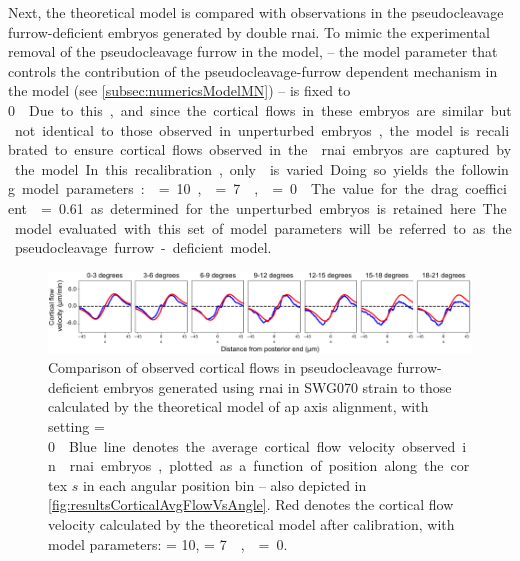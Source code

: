Next, the theoretical model is compared with observations in the pseudocleavage furrow-deficient embryos generated by  double \ac{rnai}. To mimic the experimental removal of the pseudocleavage furrow in the model, \nematicLength -- the model parameter that controls the contribution of the pseudocleavage-furrow dependent mechanism in the model (see \autoref{subsec:numericsModelMN}) -- is fixed to \SI{0}{\square\unitLength\per\second}. Due to this, and since the cortical flows in these embryos are similar but not identical to those observed in unperturbed embryos, the model is recalibrated to ensure cortical flows observed in the  \ac{rnai} embryos are captured by the model. In this recalibration, only \activeRelaxLength is varied. Doing so yields the following model parameters: \hydrodynamicLength = \SI{10}{\unitLength}, \activeRelaxLength = \SI{7}{\square\unitLength\per\second}, \nematicLength = \SI{0}{\square\unitLength\per\second}. The value for the drag coefficient \dragCoefficient = \num{0.61} as determined for the unperturbed embryos is retained here. The model evaluated with this set of model parameters will be referred to as the pseudocleavage furrow-deficient model.

\begin{figure}
    \centering
    \includegraphics[width=\textwidth]{Results/FigComparePCF/nopMelCorticalFlowModel.pdf}
    \caption[Calibrating theoretical model using cortical flows observed in pseudocleavage furrow-deficient embryos]{Comparison of observed cortical flows in pseudocleavage furrow-deficient embryos generated using  \ac{rnai} in SWG070 strain to those calculated by the theoretical model of \ac{ap} axis alignment, with setting \nematicLength = \SI{0}{\square\unitLength\per\second}. Blue line denotes the average cortical flow velocity observed in  \ac{rnai} embryos, plotted as a function of position along the cortex $s$ in each angular position bin -- also depicted in \autoref{fig:resultsCorticalAvgFlowVsAngle}. Red denotes the cortical flow velocity calculated by the theoretical model after calibration, with model parameters: \hydrodynamicLength = \SI{10}{\unitLength}, \activeRelaxLength = \SI{7}{\square\unitLength\per\second}, \nematicLength = \SI{0}{\square\unitLength\per\second}.}
    \label{fig:pcfRemovedModelCalibrationCorticalFlows}
\end{figure}

